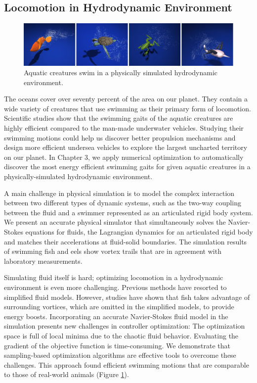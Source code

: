 \subsection{Locomotion in Hydrodynamic Environment}


\begin{figure}[!h]
  \centering
    \includegraphics[width=\textwidth]{figures/teaserSwimming.eps}
  \caption{Aquatic creatures swim in a physically simulated hydrodynamic environment.}
  \label{fig:teaser1}
\end{figure}

The oceans cover over seventy percent of the area on our planet. They contain a wide variety of creatures that use swimming as their primary form of locomotion. Scientific studies show that the swimming gaits of the aquatic creatures are highly efficient compared to the man-made underwater vehicles. Studying their swimming motions could help us discover better propulsion mechanisms and design more efficient undersea vehicles to explore the largest uncharted territory on our planet. In Chapter 3, we apply numerical optimization to automatically discover the most energy efficient swimming gaits for given aquatic creatures in a physically-simulated hydrodynamic environment.

A main challenge in physical simulation is to model the complex interaction between two different types of dynamic systems, such as the two-way coupling between the fluid and a swimmer represented as an articulated rigid body system. We present an accurate physical simulator \cite{} that simultaneously solves the Navier-Stokes equations for fluids, the Lagrangian dynamics for an articulated rigid body and matches their accelerations at fluid-solid boundaries. The simulation results of swimming fish and eels show vortex trails that are in agreement with laboratory measurements.

Simulating fluid itself is hard; optimizing locomotion in a hydrodynamic environment is even more challenging. Previous methods have resorted to simplified fluid models. However, studies have shown that fish takes advantage of surrounding vortices, which are omitted in the simplified models, to provide energy boosts. Incorporating an accurate Navier-Stokes fluid model in the simulation presents new challenges in controller optimization: The optimization space is full of local minima due to the chaotic fluid behavior. Evaluating the gradient of the objective function is time-consuming. We demonstrate that sampling-based optimization algorithms are effective tools to overcome these challenges. This approach found efficient swimming motions that are comparable to those of real-world animals (Figure \ref{fig:teaser1}). 

